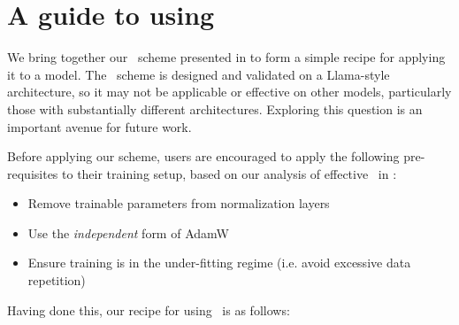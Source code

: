 \section{A guide to using \umup} \label{app:using_umup_guide}

We bring together our \umup\ scheme presented in  to form a simple recipe for applying it to a model. The \umup\ scheme is designed and validated on a Llama-style architecture, so it may not be applicable or effective on other models, particularly those with substantially different architectures. Exploring this question is an important avenue for future work.

Before applying our scheme, users are encouraged to apply the following pre-requisites to their training setup, based on our analysis of effective \mut\ in :

\begin{itemize}
    \item Remove trainable parameters from normalization layers
    \item Use the \textit{independent} form of AdamW
    \item Ensure training is in the under-fitting regime (i.e. avoid excessive data repetition)
\end{itemize}

Having done this, our recipe for using \umup\ is as follows:

